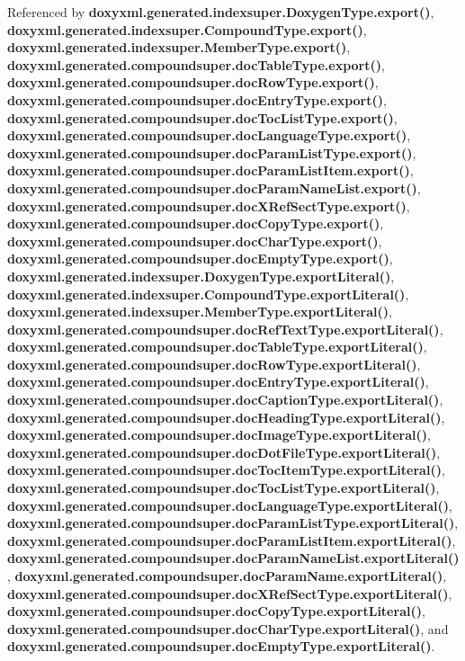 Referenced by {\bf doxyxml.\+generated.\+indexsuper.\+Doxygen\+Type.\+export()}, {\bf doxyxml.\+generated.\+indexsuper.\+Compound\+Type.\+export()}, {\bf doxyxml.\+generated.\+indexsuper.\+Member\+Type.\+export()}, {\bf doxyxml.\+generated.\+compoundsuper.\+doc\+Table\+Type.\+export()}, {\bf doxyxml.\+generated.\+compoundsuper.\+doc\+Row\+Type.\+export()}, {\bf doxyxml.\+generated.\+compoundsuper.\+doc\+Entry\+Type.\+export()}, {\bf doxyxml.\+generated.\+compoundsuper.\+doc\+Toc\+List\+Type.\+export()}, {\bf doxyxml.\+generated.\+compoundsuper.\+doc\+Language\+Type.\+export()}, {\bf doxyxml.\+generated.\+compoundsuper.\+doc\+Param\+List\+Type.\+export()}, {\bf doxyxml.\+generated.\+compoundsuper.\+doc\+Param\+List\+Item.\+export()}, {\bf doxyxml.\+generated.\+compoundsuper.\+doc\+Param\+Name\+List.\+export()}, {\bf doxyxml.\+generated.\+compoundsuper.\+doc\+X\+Ref\+Sect\+Type.\+export()}, {\bf doxyxml.\+generated.\+compoundsuper.\+doc\+Copy\+Type.\+export()}, {\bf doxyxml.\+generated.\+compoundsuper.\+doc\+Char\+Type.\+export()}, {\bf doxyxml.\+generated.\+compoundsuper.\+doc\+Empty\+Type.\+export()}, {\bf doxyxml.\+generated.\+indexsuper.\+Doxygen\+Type.\+export\+Literal()}, {\bf doxyxml.\+generated.\+indexsuper.\+Compound\+Type.\+export\+Literal()}, {\bf doxyxml.\+generated.\+indexsuper.\+Member\+Type.\+export\+Literal()}, {\bf doxyxml.\+generated.\+compoundsuper.\+doc\+Ref\+Text\+Type.\+export\+Literal()}, {\bf doxyxml.\+generated.\+compoundsuper.\+doc\+Table\+Type.\+export\+Literal()}, {\bf doxyxml.\+generated.\+compoundsuper.\+doc\+Row\+Type.\+export\+Literal()}, {\bf doxyxml.\+generated.\+compoundsuper.\+doc\+Entry\+Type.\+export\+Literal()}, {\bf doxyxml.\+generated.\+compoundsuper.\+doc\+Caption\+Type.\+export\+Literal()}, {\bf doxyxml.\+generated.\+compoundsuper.\+doc\+Heading\+Type.\+export\+Literal()}, {\bf doxyxml.\+generated.\+compoundsuper.\+doc\+Image\+Type.\+export\+Literal()}, {\bf doxyxml.\+generated.\+compoundsuper.\+doc\+Dot\+File\+Type.\+export\+Literal()}, {\bf doxyxml.\+generated.\+compoundsuper.\+doc\+Toc\+Item\+Type.\+export\+Literal()}, {\bf doxyxml.\+generated.\+compoundsuper.\+doc\+Toc\+List\+Type.\+export\+Literal()}, {\bf doxyxml.\+generated.\+compoundsuper.\+doc\+Language\+Type.\+export\+Literal()}, {\bf doxyxml.\+generated.\+compoundsuper.\+doc\+Param\+List\+Type.\+export\+Literal()}, {\bf doxyxml.\+generated.\+compoundsuper.\+doc\+Param\+List\+Item.\+export\+Literal()}, {\bf doxyxml.\+generated.\+compoundsuper.\+doc\+Param\+Name\+List.\+export\+Literal()}, {\bf doxyxml.\+generated.\+compoundsuper.\+doc\+Param\+Name.\+export\+Literal()}, {\bf doxyxml.\+generated.\+compoundsuper.\+doc\+X\+Ref\+Sect\+Type.\+export\+Literal()}, {\bf doxyxml.\+generated.\+compoundsuper.\+doc\+Copy\+Type.\+export\+Literal()}, {\bf doxyxml.\+generated.\+compoundsuper.\+doc\+Char\+Type.\+export\+Literal()}, and {\bf doxyxml.\+generated.\+compoundsuper.\+doc\+Empty\+Type.\+export\+Literal()}.



